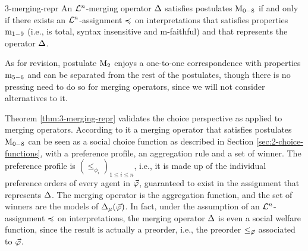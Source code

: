 \begin{thm}{\cite{KoniecznyP11}}{3-merging-repr}
	An $\L^n$-merging operator $\me$ satisfies postulates $\ppm{0-8}$
	if and only if
	there exists an $\L^n$-assignment $\as$ on interpretations
	that satisfies properties $\oom{1-9}$
	(i.e., is total, syntax insensitive and m-faithful)
	and that represents the operator $\me$.
\end{thm}

As for revision, postulate $\ppm{2}$ enjoys a one-to-one correspondence with 
properties $\oom{5-6}$ and can be separated from the rest of the postulates,
though there is no pressing need to do so for merging operators, 
since we will not consider alternatives to it.

Theorem \ref{thm:3-merging-repr} validates the choice perspective 
as applied to merging operators. According to it a merging 
operator that satisfies postulates $\ppm{0-8}$ 
can be seen as a social choice function as described 
in Section \ref{sec:2-choice-functions}, with a preference profile, 
an aggregation rule and a set of winner.
The preference profile is $(\le_{\phi_{i}})_{1\le i \le n}$,
i.e., it is made up of the individual preference orders 
of every agent in $\P$, guaranteed to exist in the assignment
that represents $\me$.
The merging operator is the aggregation function, and the set of winners 
are the models of $\me_{\mu}(\P)$.
In fact, under the assumption of an $\L^n$-assignment $\as$ on interpretations,
the merging operator $\me$ is even a social welfare function, since the result
is actually a preorder, i.e., the preorder $\le_{\P}$ associated to $\P$.


